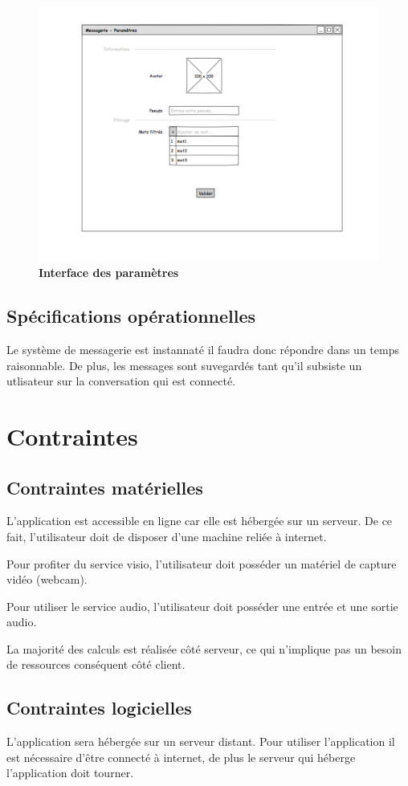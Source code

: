 \documentclass[11pt,dvipsnames,svgnames]{report}
\begin{document}
\begin{center}
\begin{figure}
\includegraphics[width=\textwidth]{maquette/maquette3.png}
\caption{\textbf{Interface des paramètres}}
\end{figure}
\end{center}


\section{Spécifications opérationnelles}

Le système de messagerie est instannaté il faudra donc répondre dans un temps raisonnable. De plus, les messages sont suvegardés tant qu'il subsiste un utlisateur sur la conversation qui est connecté.
\chapter{Contraintes}
\section{Contraintes matérielles}
L'application est accessible en ligne car elle est hébergée sur un serveur. De ce fait, l'utilisateur doit de disposer d'une machine reliée à internet.

Pour profiter du service visio, l'utilisateur doit posséder un matériel de capture vidéo (webcam).

Pour utiliser le service audio, l'utilisateur doit posséder une entrée et une sortie audio.

La majorité des calculs est réalisée côté serveur, ce qui n'implique pas un besoin de ressources conséquent côté client.

\section{Contraintes logicielles}
L'application sera hébergée sur un serveur distant.
Pour utiliser l'application il est nécessaire d'être connecté à internet, de plus le serveur qui héberge l'application doit tourner.
\end{document}
